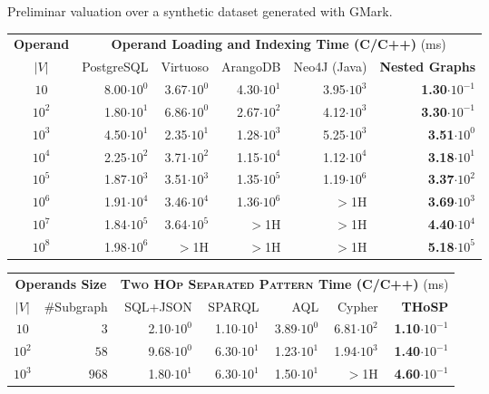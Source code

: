 \documentclass[a0,portrait]{a0poster}
\begin{document}
\begin{multicols}{2}
Preliminar valuation over a synthetic dataset generated with GMark.
%
\begin{center}
\begin{tabular}{@{}c|rrrr|r@{}}
	\toprule
	\multicolumn{1}{c}{\textbf{Operand}} & \multicolumn{5}{|c}{\textbf{Operand Loading and Indexing Time (C/C++)} (ms)}  \\
	$|V|$  & {PostgreSQL} & {Virtuoso} & {ArangoDB}  &  {Neo4J (Java)} & {\textbf{Nested Graphs}}  \\
	\midrule
	$10$   & 8.00$\cdot 10^0$ & 3.67$\cdot 10^0$ & 4.30$\cdot 10^1$ & 3.95$\cdot 10^3$  & \textbf{1.30}$\cdot 10^{-1}$\\
	$10^2$  & 1.80$\cdot 10^1$ & 6.86$\cdot 10^0$ & 2.67$\cdot 10^2$ &  4.12$\cdot 10^3$ & \textbf{3.30}$\cdot 10^{-1}$\\
	$10^3$  & 4.50$\cdot 10^1$ & 2.35$\cdot 10^1$ & 1.28$\cdot 10^3$ & 5.25$\cdot 10^3$ & \textbf{3.51}$\cdot 10^0$\\
	$10^4$   & 2.25$\cdot 10^2$ & 3.71$\cdot 10^2$ & 1.15$\cdot 10^4$ &  1.12$\cdot 10^4$ & \textbf{3.18}$\cdot 10^1$\\
	$10^5$   & 1.87$\cdot 10^3$ & 3.51$\cdot 10^3$ & 1.35$\cdot 10^5$ &  1.19$\cdot 10^6$ & \textbf{3.37}$\cdot 10^2$ \\
	$10^6$  & 1.91$\cdot 10^4$ & 3.46$\cdot 10^4$ & 1.36$\cdot 10^6$ & $>$1H & \textbf{3.69}$\cdot 10^3$\\
	$10^7$   & 1.84$\cdot 10^5$ & 3.64$\cdot 10^5$ & $>$1H & $>$1H & \textbf{4.40}$\cdot 10^4$\\
	$10^8$  & 1.98$\cdot 10^6$ & $>$1H & $>$1H & $>$1H & \textbf{5.18}$\cdot 10^5$\\
	\bottomrule
\end{tabular}
\begin{tabular}{@{}cr|rrrr|r@{}}
	\toprule
	\multicolumn{2}{c}{\textbf{Operands Size}} & \multicolumn{5}{|c}{\textbf{\textsc{Two HOp Separated Pattern} Time (C/C++)} (ms)}  \\
	$|V|$  & \#Subgraph  &  {SQL+JSON} & SPARQL & AQL  &  Cypher &{\textbf{THoSP}}  \\
	\midrule
	$10$ & $3$  & 2.10$\cdot 10^0$ &  1.10$\cdot 10^1$ & 3.89$\cdot 10^0$  & 6.81$\cdot 10^2$  & \textbf{1.10}$\cdot 10^{-1}$\\
	$10^2$ & $58$  & 9.68$\cdot 10^0$ &  6.30$\cdot 10^1$ & 1.23$\cdot 10^1$  &  1.94$\cdot 10^3$ & \textbf{1.40}$\cdot 10^{-1}$\\
	$10^3$ & $968$  & 1.80$\cdot 10^1$ & 6.30$\cdot 10^1$ & 1.50$\cdot 10^1$ & $>$1H & \textbf{4.60}$\cdot 10^{-1}$\\

\end{tabular}
\end{center}
\end{multicols}
\end{document}
